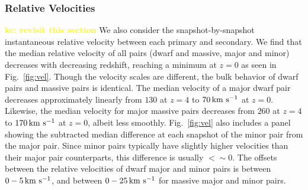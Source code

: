 \documentclass[twocolumn]{aastex631}
\newcommand{\kc}[1]{\textcolor{yellow}{\textbf{kc: #1}} }
\begin{document}
\subsubsection{Relative Velocities}
\kc{revisit this section } We also consider the snapshot-by-snapshot instantaneous relative velocity between each primary and secondary.
We find that the median relative velocity of all pairs (dwarf and massive, major and minor) decreases with decreasing redshift, reaching a minimum at $z=0$ as seen in Fig.~\ref{fig:vel}. 
Though the velocity scales are different, the bulk behavior of dwarf pairs and massive pairs is identical. 
\linebreak
The median velocity of a major dwarf pair decreases approximately linearly from $130$ at $z=4$ to $70\,\mathrm{km}~\mathrm{s}^{-1}$ at $z=0$. Likewise, the median velocity for major massive pairs decreases from $260$ at $z=4$ to $170\,\mathrm{km}~\mathrm{s}^{-1}$ at $z=0$, albeit less smoothly. 
Fig.~\ref{fig:vel} also includes a panel showing the subtracted median difference at each snapshot of the minor pair from the major pair. Since minor pairs typically have slightly higher velocities than their major pair counterparts, this difference is usually $<\sim0$. The offsets between the relative velocities of dwarf major and minor pairs is between $0-5\,\mathrm{km}~\mathrm{s}^{-1}$, and between $0-25\,\mathrm{km}~\mathrm{s}^{-1}$ for massive major and minor pairs.
\end{document}
